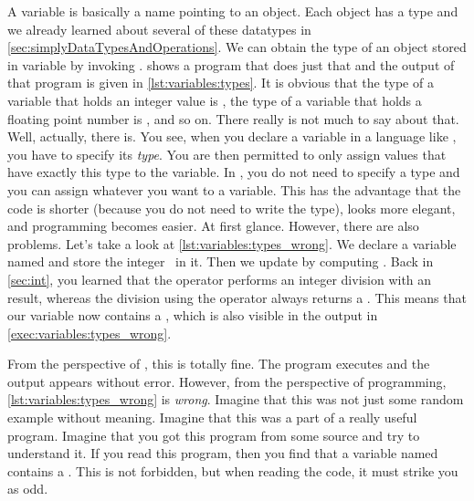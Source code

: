 %
\label{sec:variableTypesAndTypeHints}%
%
%
%
%
%
A variable is basically a name pointing to an object.
Each object has a type and we already learned about several of these datatypes in \cref{sec:simplyDataTypesAndOperations}.
We can obtain the type of an object stored in variable  by invoking .
 shows a program that does just that and the output of that program is given in \cref{lst:variables:types}.
It is obvious that the type of a variable that holds an integer value is , the type of a variable that holds a floating point number is , and so on.
There really is not much to say about that.%
\endhsection%
%
%
\label{sec:typesAndConfusion}%
%
%
%
%
Well, actually, there is.
You see, when you declare a variable in a language like , you have to specify its \emph{type}.
You are then permitted to only assign values that have exactly this type to the variable.
In \python, you do not need to specify a type and you can assign whatever you want to a variable.
This has the advantage that the code is shorter (because you do not need to write the type), looks more elegant, and programming becomes easier.
At first glance.
However, there are also problems.
Let's take a look at \cref{lst:variables:types_wrong}.
We declare a variable named  and store the integer~ in it.
Then we update  by computing .
Back in \cref{sec:int}, you learned that the \pythonilIdx{//} operator performs an integer division with an  result, whereas the division using the \pythonilIdx{/} operator always returns a .
This means that our variable  now contains a , which is also visible in the output in \cref{exec:variables:types_wrong}.

From the perspective of \python, this is totally fine.
The program executes and the output appears without error.
However, from the perspective of programming, \cref{lst:variables:types_wrong} is \emph{wrong}.
Imagine that this was not just some random example without meaning.
Imagine that this was a part of a really useful program.
Imagine that you got this program from some source and try to understand it.
If you read this program, then you find that a variable named  contains a .
This is not forbidden, but when reading the code, it must strike you as odd.

